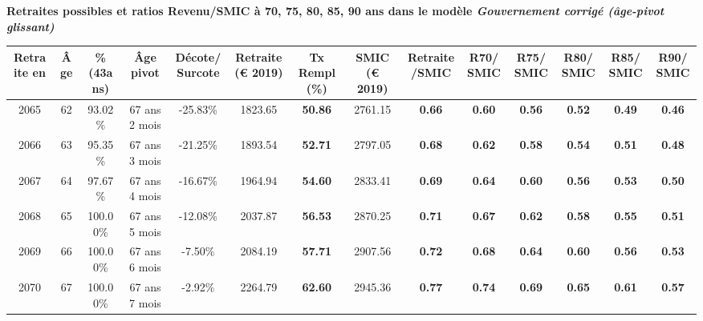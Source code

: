  \vspace{0.1cm} 
{\bf \noindent Retraites possibles et ratios Revenu/SMIC à 70, 75, 80, 85, 90 ans dans le modèle \emph{Gouvernement corrigé (âge-pivot glissant)}}  
 
\begin{adjustbox}{max width=\textwidth} 
\begin{tabular}[htb]{|c|c||c|c|c||c|c||c|c||c|c|c|c|c|} 
\hline 
 Retraite en &  Âge &  \%(43ans) &  Âge pivot &  Décote/Surcote &  Retraite (\euro{} 2019) &  Tx Rempl(\%) &  SMIC (\euro{} 2019) &  Retraite/SMIC &  R70/SMIC &  R75/SMIC &  R80/SMIC &  R85/SMIC &  R90/SMIC \\ 
\hline \hline 
 2065 &  62 &  93.02\% &  67 ans 2 mois &  -25.83\% &  1823.65 &  {\bf 50.86} &  2761.15 &  {\bf {\color{red} 0.66}} &  {\bf {\color{red} 0.60}} &  {\bf {\color{red} 0.56}} &  {\bf {\color{red} 0.52}} &  {\bf {\color{red} 0.49}} &  {\bf {\color{red} 0.46}} \\ 
\hline 
 2066 &  63 &  95.35\% &  67 ans 3 mois &  -21.25\% &  1893.54 &  {\bf 52.71} &  2797.05 &  {\bf {\color{red} 0.68}} &  {\bf {\color{red} 0.62}} &  {\bf {\color{red} 0.58}} &  {\bf {\color{red} 0.54}} &  {\bf {\color{red} 0.51}} &  {\bf {\color{red} 0.48}} \\ 
\hline 
 2067 &  64 &  97.67\% &  67 ans 4 mois &  -16.67\% &  1964.94 &  {\bf 54.60} &  2833.41 &  {\bf {\color{red} 0.69}} &  {\bf {\color{red} 0.64}} &  {\bf {\color{red} 0.60}} &  {\bf {\color{red} 0.56}} &  {\bf {\color{red} 0.53}} &  {\bf {\color{red} 0.50}} \\ 
\hline 
 2068 &  65 &  100.00\% &  67 ans 5 mois &  -12.08\% &  2037.87 &  {\bf 56.53} &  2870.25 &  {\bf {\color{red} 0.71}} &  {\bf {\color{red} 0.67}} &  {\bf {\color{red} 0.62}} &  {\bf {\color{red} 0.58}} &  {\bf {\color{red} 0.55}} &  {\bf {\color{red} 0.51}} \\ 
\hline 
 2069 &  66 &  100.00\% &  67 ans 6 mois &  -7.50\% &  2084.19 &  {\bf 57.71} &  2907.56 &  {\bf {\color{red} 0.72}} &  {\bf {\color{red} 0.68}} &  {\bf {\color{red} 0.64}} &  {\bf {\color{red} 0.60}} &  {\bf {\color{red} 0.56}} &  {\bf {\color{red} 0.53}} \\ 
\hline 
 2070 &  67 &  100.00\% &  67 ans 7 mois &  -2.92\% &  2264.79 &  {\bf 62.60} &  2945.36 &  {\bf {\color{red} 0.77}} &  {\bf {\color{red} 0.74}} &  {\bf {\color{red} 0.69}} &  {\bf {\color{red} 0.65}} &  {\bf {\color{red} 0.61}} &  {\bf {\color{red} 0.57}} \\ 
\hline 
\hline 
\end{tabular} 
\end{adjustbox} 
 
